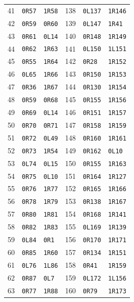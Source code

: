 \begin{longtable}{@{}rll@{\hspace{2em}}rll@{}}
41 & \texttt{0R57} & \texttt{1R58} & 138 & \texttt{0L137} & \texttt{1R146}\\
42 & \texttt{0R59} & \texttt{0R60} & 139 & \texttt{0L147} & \texttt{1R41}\\
43 & \texttt{0R61} & \texttt{0L14} & 140 & \texttt{0R148} & \texttt{1R149}\\
44 & \texttt{0R62} & \texttt{1R63} & 141 & \texttt{0L150} & \texttt{1L151}\\
45 & \texttt{0R55} & \texttt{1R64} & 142 & \texttt{0R28} & \texttt{1R152}\\
46 & \texttt{0L65} & \texttt{1R66} & 143 & \texttt{0R150} & \texttt{1R153}\\
47 & \texttt{0R36} & \texttt{1R67} & 144 & \texttt{0R130} & \texttt{1R154}\\
48 & \texttt{0R59} & \texttt{0R68} & 145 & \texttt{0R155} & \texttt{1R156}\\
49 & \texttt{0R69} & \texttt{0L14} & 146 & \texttt{0R151} & \texttt{1R157}\\
50 & \texttt{0R70} & \texttt{0R71} & 147 & \texttt{0R158} & \texttt{1R159}\\
51 & \texttt{0R72} & \texttt{0L49} & 148 & \texttt{0R160} & \texttt{1R161}\\
52 & \texttt{0R73} & \texttt{1R54} & 149 & \texttt{0R162} & \texttt{0L10}\\
53 & \texttt{0L74} & \texttt{0L15} & 150 & \texttt{0R155} & \texttt{1R163}\\
54 & \texttt{0R75} & \texttt{0L10} & 151 & \texttt{0R164} & \texttt{1R127}\\
55 & \texttt{0R76} & \texttt{1R77} & 152 & \texttt{0R165} & \texttt{1R166}\\
56 & \texttt{0R78} & \texttt{1R79} & 153 & \texttt{0R138} & \texttt{1R167}\\
57 & \texttt{0R80} & \texttt{1R81} & 154 & \texttt{0R168} & \texttt{1R141}\\
58 & \texttt{0R82} & \texttt{1R83} & 155 & \texttt{0L169} & \texttt{1R139}\\
59 & \texttt{0L84} & \texttt{0R1} & 156 & \texttt{0R170} & \texttt{1R171}\\
60 & \texttt{0R85} & \texttt{1R60} & 157 & \texttt{0R134} & \texttt{1R151}\\
61 & \texttt{0L76} & \texttt{1L86} & 158 & \texttt{0R41} & \texttt{1R159}\\
62 & \texttt{0R87} & \texttt{0L7} & 159 & \texttt{0L172} & \texttt{1L156}\\
63 & \texttt{0R77} & \texttt{1R88} & 160 & \texttt{0R79} & \texttt{1R173}\\

\end{longtable}

